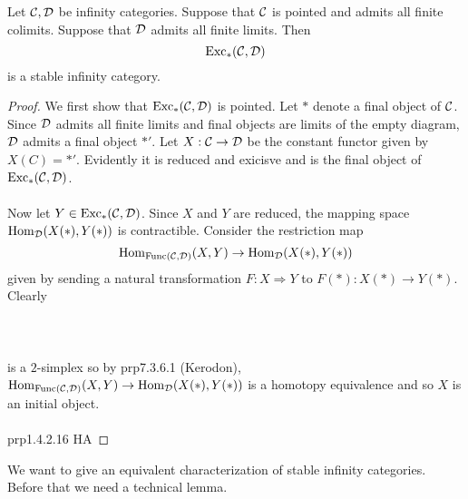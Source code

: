 \documentclass[a4paper]{article}
\begin{document}
\begin{prp}{}{} Let $\mathcal{C},\mathcal{D}$ be infinity categories. Suppose that $\mathcal{C}$ is pointed and admits all finite colimits. Suppose that $\mathcal{D}$ admits all finite limits. Then $$\text{Exc}_\ast(\mathcal{C},\mathcal{D})$$ is a stable infinity category. \tcbline
\begin{proof}
We first show that $\text{Exc}_\ast(\mathcal{C},\mathcal{D})$ is pointed. Let $\ast$ denote a final object of $\mathcal{C}$. Since $\mathcal{D}$ admits all finite limits and final objects are limits of the empty diagram, $\mathcal{D}$ admits a final object $\ast'$. Let $X:\mathcal{C}\to\mathcal{D}$ be the constant functor given by $X(C)=\ast'$. Evidently it is reduced and exicisve and is the final object of $\text{Exc}_\ast(\mathcal{C},\mathcal{D})$. \\~\\

Now let $Y\in\text{Exc}_\ast(\mathcal{C},\mathcal{D})$. Since $X$ and $Y$ are reduced, the mapping space $\operatorname{Hom}_{\mathcal{D}}(X(\ast),Y(\ast))$ is contractible. Consider the restriction map $$\operatorname{Hom}_{\text{Func}(\mathcal{C},\mathcal{D})}(X,Y)\to\operatorname{Hom}_{\mathcal{D}}(X(\ast),Y(\ast))$$ given by sending a natural transformation $F:X\Rightarrow Y$ to $F(\ast):X(\ast)\to Y(\ast)$. Clearly \\~\\
\\~\\
is a $2$-simplex so by prp7.3.6.1 (Kerodon), $\operatorname{Hom}_{\text{Func}(\mathcal{C},\mathcal{D})}(X,Y)\to\operatorname{Hom}_{\mathcal{D}}(X(\ast),Y(\ast))$ is a homotopy equivalence and so $X$ is an initial object. \\~\\

prp1.4.2.16 HA
\end{proof}
\end{prp}

We want to give an equivalent characterization of stable infinity categories. Before that we need a technical lemma. 
\end{document}
